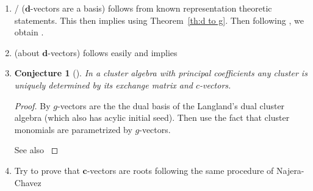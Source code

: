 \documentclass[12pt]{amsart}
\newtheorem{conjecture}[theorem]{Conjecture}
\newcommand{\bfc}{\mathbf{c}}
\newcommand{\bfd}{\mathbf{d}}
\begin{document}
  \begin{enumerate}
    \item
      \cite[Con. 7.6]{fomin-zelevinsky4}/\cite[Conj. 3.22]{reading-speyer} ($\bfd$-vectors are a basis) follows from known representation theoretic statements.
      This then implies \cite[Conj. 7.10]{fomin-zelevinsky4} using Theorem~\ref{th:d to g}.
      Then following \cite[Rem. 7.11]{fomin-zelevinsky4}, we obtain \cite[Con. 7.2]{fomin-zelevinsky4}.
    
    \item
      \cite[Conj. 7.4]{fomin-zelevinsky4} (about $\bfd$-vectors) follows easily and implies \cite[Conj. 7.5]{fomin-zelevinsky4}


    \item
      
      \begin{conjecture}[{\cite[Conjecture 4.7]{fomin-zelevinsky4}}]
        In a cluster algebra with principal coefficients any cluster is uniquely determined by its exchange matrix and $c$-vectors.
      \end{conjecture}
      \begin{proof}
        By \cite{NZ12} $g$-vectors are the the dual basis of the Langland's dual cluster algebra (which also has acylic initial seed). 
        Then use the fact that cluster monomials are parametrized by $g$-vectors.
        
        See also \cite[Conjectures 3.11 and 3.12]{reading-speyer}
      \end{proof}

    \item
      Try to prove that $\bfc$-vectors are roots following the same procedure of Najera-Chavez
  \end{enumerate}




\end{document}
